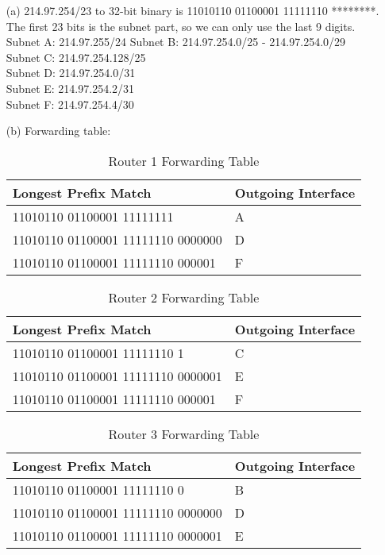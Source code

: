 \documentclass[12pt,a4paper]{article}
\begin{document}
\begin{enumerate}
    \item [(a)] 
        214.97.254/23 to 32-bit binary is 11010110 01100001 11111110 ********.\\
        The first 23 bits is the subnet part, so we can only use the last 9 digits.\\
        Subnet A: 214.97.255/24
        Subnet B: 214.97.254.0/25 - 214.97.254.0/29 \\
        Subnet C: 214.97.254.128/25 \\
        Subnet D: 214.97.254.0/31 \\
        Subnet E: 214.97.254.2/31 \\
        Subnet F: 214.97.254.4/30
    \item[(b)]
        Forwarding table:
        \begin{table}[!ht]
            \centering
            \begin{tabular}{|l|l|}
            \hline
                Longest Prefix Match & Outgoing Interface \\ \hline
                11010110 01100001 11111111 & A \\ \hline
                11010110 01100001 11111110 0000000 & D \\ \hline
                11010110 01100001 11111110 000001  & F \\ \hline
            \end{tabular}
            \caption{Router 1 Forwarding Table}
        \end{table}

        \begin{table}[!ht]
            \centering
            \begin{tabular}{|l|l|}
            \hline
                Longest Prefix Match & Outgoing Interface \\ \hline
                11010110 01100001 11111110 1 & C \\ \hline
                11010110 01100001 11111110 0000001 & E \\ \hline
                11010110 01100001 11111110 000001  & F \\ \hline
            \end{tabular}
            \caption{Router 2 Forwarding Table}
        \end{table}

        \begin{table}[!ht]
            \centering
            \begin{tabular}{|l|l|}
            \hline
                Longest Prefix Match & Outgoing Interface \\ \hline
                11010110 01100001 11111110 0 & B \\ \hline
                11010110 01100001 11111110 0000000 & D \\ \hline
                11010110 01100001 11111110 0000001  & E \\ \hline
            \end{tabular}
            \caption{Router 3 Forwarding Table}
        \end{table}

\end{enumerate}
\end{document}
